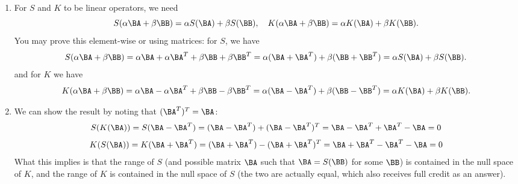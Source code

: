 \begin{enumerate}
\item For $S$ and $K$ to be linear operators, we need
\[
S(\alpha \BA + \beta\BB) = \alpha S(\BA) + \beta S(\BB), \quad 
K(\alpha \BA + \beta\BB) = \alpha K(\BA) + \beta K(\BB).
\]
You may prove this element-wise or using matrices: for $S$, we have
\[
S(\alpha \BA + \beta\BB) = \alpha \BA + \alpha \BA^T + \beta \BB + \beta \BB^T = \alpha (\BA + \BA^T) + \beta (\BB + \BB^T )=\alpha S(\BA) + \beta S(\BB).
\]
and for $K$ we have
\[
K(\alpha \BA + \beta\BB) = \alpha \BA - \alpha \BA^T + \beta \BB - \beta \BB^T = \alpha (\BA - \BA^T) + \beta (\BB - \BB^T )=\alpha K(\BA) + \beta K(\BB).
\]
\item We can show the result by noting that $(\BA^T)^T = \BA$:
\[
S(K(\BA)) = S(\BA - \BA^T) = (\BA - \BA^T) + (\BA - \BA^T)^T = \BA - \BA^T + \BA^T - \BA = 0
\]
\[
K(S(\BA)) = K(\BA + \BA^T) = (\BA + \BA^T) - (\BA + \BA^T)^T = \BA + \BA^T - \BA^T - \BA = 0
\]
What this implies is that the range of $S$ (and possible matrix $\BA$ such that $\BA = S(\BB)$ for some $\BB$) is contained in the null space of $K$, and the range of $K$ is contained in the null space of $S$ (the two are actually equal, which also receives full credit as an answer).  
\end{enumerate}
